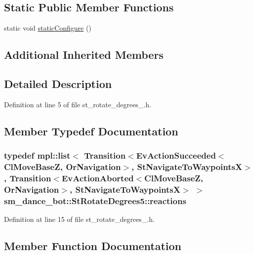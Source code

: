 \subsection*{Static Public Member Functions}
\begin{DoxyCompactItemize}
\item 
static void \hyperlink{structsm__dance__bot_1_1StRotateDegrees5_a60fd6ec21fe69a27245785e83b610b57}{static\+Configure} ()
\end{DoxyCompactItemize}
\subsection*{Additional Inherited Members}


\subsection{Detailed Description}


Definition at line 5 of file st\+\_\+rotate\+\_\+degrees\+\_.\+h.



\subsection{Member Typedef Documentation}
\subsubsection[{\texorpdfstring{reactions}{reactions}}]{\setlength{\rightskip}{0pt plus 5cm}typedef mpl\+::list$<$ Transition$<${\bf Ev\+Action\+Succeeded}$<${\bf Cl\+Move\+BaseZ}, {\bf Or\+Navigation}$>$, {\bf St\+Navigate\+To\+WaypointsX}$>$, Transition$<${\bf Ev\+Action\+Aborted}$<${\bf Cl\+Move\+BaseZ}, {\bf Or\+Navigation}$>$, {\bf St\+Navigate\+To\+WaypointsX}$>$ $>$ {\bf sm\+\_\+dance\+\_\+bot\+::\+St\+Rotate\+Degrees5\+::reactions}}\hypertarget{structsm__dance__bot_1_1StRotateDegrees5_a4a656e380d1f371b16d3daf9361cdf23}{}\label{structsm__dance__bot_1_1StRotateDegrees5_a4a656e380d1f371b16d3daf9361cdf23}


Definition at line 15 of file st\+\_\+rotate\+\_\+degrees\+\_.\+h.



\subsection{Member Function Documentation}

